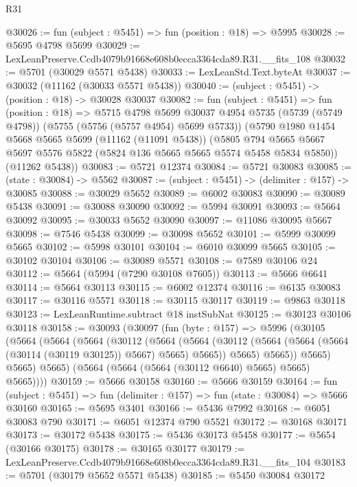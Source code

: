 \begin{lexlean}{R31}
\begin{coremodule}
@30026 := fun (subject : @5451) => fun (position : @18) => @5995
@30028 := @5695 @4798 @5699
@30029 := LexLeanPreserve.Ccdb4079b91668e608b0ecca3364cda89.R31.__fits_108
@30032 := @5701 (@30029 @5571 @5438)
@30033 := LexLeanStd.Text.byteAt
@30037 := @30032 (@11162 (@30033 @5571 @5438))
@30040 := (subject : @5451) -> (position : @18) -> @30028 @30037
@30082 := fun (subject : @5451) =>
  fun (position : @18) =>
  @5715
    @4798
    @5699
    @30037
    @4954
    @5735
    (@5739 (@5749 @4798))
    (@5755 (@5756 (@5757 @4954) @5699 @5733))
    (@5790
      @1980
      @1454
      @5668
      @5665
      @5699
      (@11162 (@11091 @5438))
      (@5805 @794 @5665 @5667 @5697 @5576 @5822 (@5824 @136 @5665 @5665 @5574 @5458 @5834 @5850))
      (@11262 @5438))
@30083 := @5721 @12374
@30084 := @5721 @30083
@30085 := (state : @30084) -> @5562
@30087 := (subject : @5451) -> (delimiter : @157) -> @30085
@30088 := @30029 @5652
@30089 := @6002 @30083
@30090 := @30089 @5438
@30091 := @30088 @30090
@30092 := @5994 @30091
@30093 := @5664 @30092
@30095 := @30033 @5652 @30090
@30097 := @11086 @30095 @5667
@30098 := @7546 @5438
@30099 := @30098 @5652
@30101 := @5999 @30099 @5665
@30102 := @5998 @30101
@30104 := @6010 @30099 @5665
@30105 := @30102 @30104
@30106 := @30089 @5571
@30108 := @7589 @30106 @24
@30112 := @5664 (@5994 (@7290 @30108 @7605))
@30113 := @5666 @6641
@30114 := @5664 @30113
@30115 := @6002 @12374
@30116 := @6135 @30083
@30117 := @30116 @5571
@30118 := @30115 @30117
@30119 := @9863 @30118
@30123 := LexLeanRuntime.subtract @18 instSubNat
@30125 := @30123 @30106 @30118
@30158 := @30093
    (@30097
      (fun (byte : @157) =>
      @5996
        (@30105
          (@5664
            (@5664
              (@5664
                (@30112
                  (@5664
                    (@5664
                      (@30112 (@5664 (@5664 (@5664 (@30114 (@30119 @30125)) @5667) @5665) @5665))
                      @5665)
                    @5665))
                @5665)
              @5665)
            @5665)
          (@5664 (@5664 (@5664 (@30112 @6640) @5665) @5665) @5665))))
@30159 := @5666 @30158
@30160 := @5666 @30159
@30164 := fun (subject : @5451) => fun (delimiter : @157) => fun (state : @30084) => @5666 @30160
@30165 := @5695 @3401
@30166 := @5436 @7992
@30168 := @6051 @30083 @790
@30171 := @6051 @12374 @790 @5521
@30172 := @30168 @30171
@30173 := @30172 @5438
@30175 := @5436 @30173 @5458
@30177 := @5654 (@30166 @30175)
@30178 := @30165 @30177
@30179 := LexLeanPreserve.Ccdb4079b91668e608b0ecca3364cda89.R31.__fits_104
@30183 := @5701 (@30179 @5652 @5571 @5438)
@30185 := @5450 @30084 @30172

\end{coremodule}
\end{lexlean}
